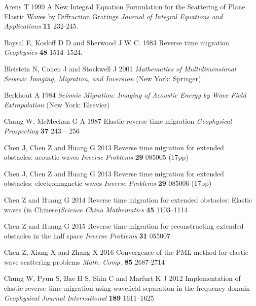 \documentclass[12pt]{iopart}
\begin{document}
{\begin{thebibliography}{99}
	Arens T 1999 {A New Integral Equation Formulation for the Scattering of Plane Elastic Waves by Diffraction Gratings} {\it Journal of Integral Equations and Applications} {\bf 11} 232-245.
	
	Baysal E, Kosloff D D and Sherwood J W C. 1983 {Reverse time migration} {\it Geophysics} {\bf 48} 1514--1524.
	
	Bleistein N, Cohen J and Stockwell J 2001 {\em Mathematics of Multidimensional Seismic Imaging, Migration, and Inversion} (New York: Springer)
	
	{Berkhout A}  1984 {\em Seismic Migration: Imaging of Acoustic Energy by Wave Field Extrapolation}  (New York: Elsevier)
	
	Chang W, McMechan G A 1987 {Elastic reverse-time migration} {\it Geophysical Prospecting} {\bf 37} 
	243 -- 256 
	
	Chen J,  Chen Z and  Huang G 2013 {Reverse time migration for extended obstacles: acoustic waves}  {\it Inverse Problems} {\bf 29}  085005 (17pp)
	
	Chen J,  Chen Z and  Huang G 2013 {Reverse time migration for extended obstacles: electromagnetic waves} {\it Inverse Problems}
	{\bf 29} 085006 (17pp)
	
	Chen Z  and  Huang G 2014 {Reverse time migration for extended obstacles: Elastic waves} (in Chinese){\it Science China Mathematics} {\bf 45} 1103--1114
	
	
	Chen Z and Huang G 2015 {Reverse time migration for reconstructing extended obstacles in the half space}  {\it Inverse Problems} {\bf 31 }  055007 
	
	Chen Z, Xiang X and Zhang X 2016 {Convergence of the PML method for elastic wave scattering problems}  {\it Math. Comp.} {\bf 85}  2687-2714
	
	Chung W, Pyun S, Bae H S, Shin C and Marfurt K J 2012 {Implementation of elastic reverse-time migration using wavefield separation in the frequency domain} {\it Geophysical Journal International} {\bf 189} 1611--1625
	

\end{thebibliography}}
\end{document}
